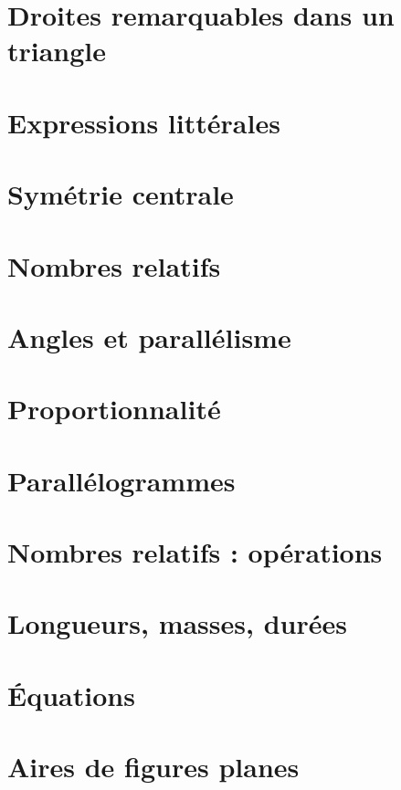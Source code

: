 \documentclass[a4paper,10pt]{book}
\begin{document}
\chapter{Droites remarquables dans un triangle}


\chapter{Expressions littérales}


\chapter{Symétrie centrale}


\chapter{Nombres relatifs}


\chapter{Angles et parallélisme}


\chapter{Proportionnalité}


\chapter{Parallélogrammes}


\chapter{Nombres relatifs : opérations}


\chapter{Longueurs, masses, durées}


\chapter{Équations}


\chapter{Aires de figures planes}

\end{document}
